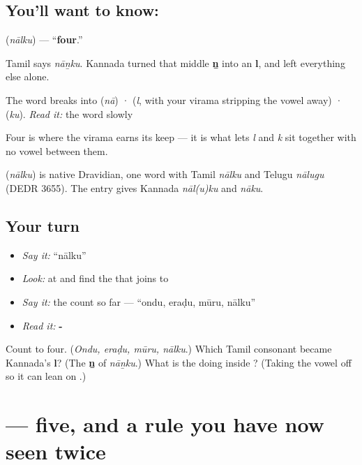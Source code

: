 \subsection*{You'll want to know: }
\textbf{} (\emph{nālku}) — \textquotedblleft{}\textbf{four}.\textquotedblright{}

Tamil says \emph{nāṉku}. Kannada turned that middle \textbf{ṉ} into an \textbf{l}, and left everything else alone.

The word breaks into \textbf{} (\emph{nā}) · \textbf{} (\emph{l}, with your virama stripping the vowel away) · \textbf{} (\emph{ku}). \emph{Read it:} the word slowly

Four is where the virama earns its keep — it is what lets \emph{l} and \emph{k} sit together with no vowel between them.

\begin{cousinweb}
\textbf{} (\emph{nālku}) is native Dravidian, one word with Tamil \emph{nālku} and Telugu \emph{nālugu} (DEDR 3655). The entry gives Kannada \emph{nāl(u)ku} and \emph{nāku}.
\end{cousinweb}

\subsection*{Your turn}
\begin{itemize}
\raggedright
  \item \emph{Say it:} \textquotedblleft{}nālku\textquotedblright{}
  \item \emph{Look:} at  and find the  that joins  to 
  \item \emph{Say it:} the count so far — \textquotedblleft{}ondu, eraḍu, mūru, nālku\textquotedblright{}
  \item \emph{Read it:} \textbf{-}
\end{itemize}

\begin{tcolorbox}[breakable,colback=teal!4,colframe=teal!35!black,title={Before you move on}]
Count to four. (\emph{Ondu, eraḍu, mūru, nālku}.) Which Tamil consonant became Kannada's \textbf{l}? (The \textbf{ṉ} of \emph{nāṉku}.) What is the  doing inside ? (Taking the vowel off  so it can lean on .)
\end{tcolorbox}
\section[\texorpdfstring{\kn{ಐದು} (aidu)}{ಐದು (aidu)}]{ — five, and a rule you have now seen twice}

